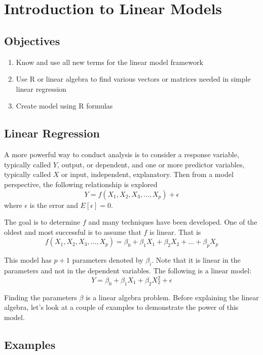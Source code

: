 \documentclass[]{book}
\providecommand{\tightlist}{%
  \setlength{\itemsep}{0pt}\setlength{\parskip}{0pt}}
\theoremstyle{definition}
\theoremstyle{definition}
\theoremstyle{definition}
\theoremstyle{remark}
\begin{document}
\hypertarget{L29}{\section{Introduction to Linear Models}\label{L29}}

\subsection{Objectives}\label{objectives-26}

\begin{enumerate}
\def\labelenumi{\arabic{enumi}.}
\tightlist
\item
  Know and use all new terms for the linear model framework\\
\item
  Use R or linear algebra to find various vectors or matrices needed in
  simple linear regression\\
\item
  Create model using R formulas
\end{enumerate}

\subsection{Linear Regression}\label{linear-regression}

A more powerful way to conduct analysis is to consider a response
variable, typically called \(Y\), output, or dependent, and one or more
predictor variables, typically called \(X\) or input, independent,
explanatory. Then from a model perspective, the following relationship
is explored \[Y=f(X_{1},X_{2},X_{3}, ...,X_{p})+\epsilon\] where
\(\epsilon\) is the error and \(E[\epsilon]=0\).

The goal is to determine \(f\) and many techniques have been developed.
One of the oldest and most successful is to assume that \(f\) is linear.
That is
\[f(X_{1},X_{2},X_{3}, ...,X_{p})=\beta_{0}+\beta_{1}X_{1}+\beta_{2}X_{2}+...+\beta_{p}X_{p}\]

This model has \(p+1\) parameters denoted by \(\beta_{i}\). Note that it
is linear in the parameters and not in the dependent variables. The
following is a linear model:
\[Y=\beta_{0}+\beta_{1}X_{1}+\beta_{2}X_{2}^{2}+\epsilon\]

Finding the parameters \(\beta\) is a linear algebra problem. Before
explaining the linear algebra, let's look at a couple of examples to
demonstrate the power of this model.

\subsection{Examples}\label{examples-1}
\end{document}
